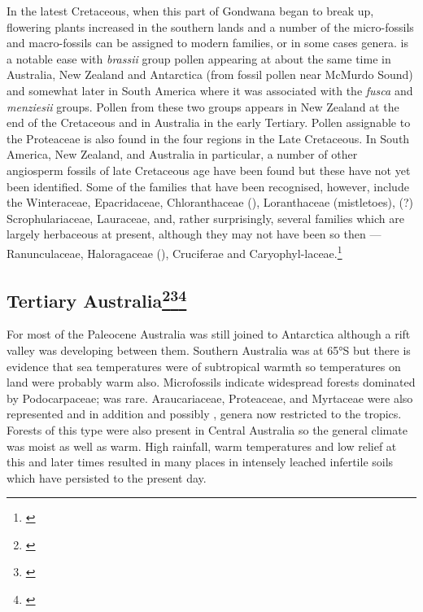 In the latest Cretaceous, when this part of Gondwana began to break up, flowering plants increased in the southern lands and a number of the micro-fossils and macro-fossils can be assigned to modern families, or in some cases genera.  is a notable ease with \emph{brassii} group pollen appearing at about the same time in Australia, New Zealand and Antarctica (from fossil pollen near McMurdo Sound) and somewhat later in South America where it was associated with the \emph{fusca} and \emph{menziesii} groups.
Pollen from these two groups appears in New Zealand at the end of the Cretaceous and in Australia in the early Tertiary.
Pollen assignable to the Proteaceae is also found in the four regions in the Late Cretaceous.
In South America, New Zealand, and Australia in particular, a number of other angiosperm fossils of late Cretaceous age have been found but these have not yet been identified.
Some of the families that have been recognised, however, include the Winteraceae, Epacridaceae, Chloranthaceae (), Loranthaceae (mistletoes), (?) Scrophulariaceae, Lauraceae, and, rather surprisingly, several families which are largely herbaceous at present, although they may not have been so then --- Ranunculaceae, Haloragaceae (), Cruciferae and Caryophyl-laceae.\footnote{\cite{mildenhall1980new}}

\subsection[Tertiary Australia]{Tertiary Australia\thinspace\footnote{\cite{kemp1978tertiary}}\footnote{\cite{martin1981tertiary}}\footnote{\cite{smith1982history}}}

For most of the Paleocene Australia was still joined to Antarctica although a rift valley was developing between them.
Southern Australia was at \ang{65}S but there is evidence that sea temperatures were of subtropical warmth so temperatures on land were probably warm also.
Microfossils indicate widespread forests dominated by Podocarpaceae;  was rare.
Araucariaceae, Proteaceae, and Myrtaceae were also represented and in addition  and possibly , genera now restricted to the tropics.
Forests of this type were also present in Central Australia so the general climate was moist as well as warm.
High rainfall, warm temperatures and low relief at this and later times resulted in many places in intensely leached infertile soils which have persisted to the present day.

